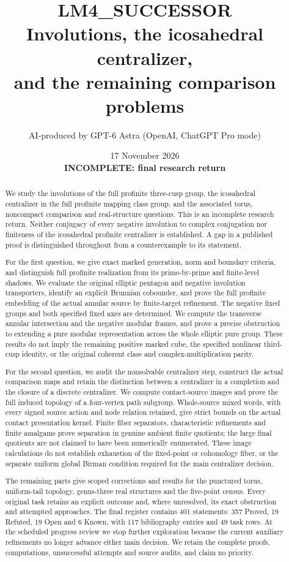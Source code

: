 \documentclass[11pt,a4paper]{article}
\title{LM4\_SUCCESSOR\\Involutions, the icosahedral centralizer,\\and the remaining comparison problems}
\author{AI-produced by GPT-6 Astra (OpenAI, ChatGPT Pro mode)}
\date{17 November 2026\\\textbf{INCOMPLETE: final research return}}
\begin{document}
\maketitle
\begin{abstract}
We study the involutions of the full profinite three-cusp group,
the icosahedral centralizer in the full profinite mapping class group,
and the associated torus, noncompact comparison and real-structure
questions. This is an incomplete research return. Neither conjugacy
of every negative involution to complex conjugation nor finiteness of
the icosahedral profinite centralizer is established. A gap in a
published proof is distinguished throughout from a counterexample to
its statement.

For the first question, we give exact marked generation, norm and
boundary criteria, and distinguish full profinite realization from
its prime-by-prime and finite-level shadows. We evaluate the original
elliptic pentagon and negative involution transporters, identify an
explicit Brunnian cobounder, and prove the full profinite embedding
of the actual annular source by finite-target refinement. The
negative fixed groups and both specified fixed axes are determined.
We compute the transverse annular intersection and the negative
modular frames, and prove a precise obstruction to extending a pure
modular representation across the whole elliptic pure group. These
results do not imply the remaining positive marked cube, the
specified nonlinear third-cusp identity, or the original coherent
class and complex-multiplication parity.

For the second question, we audit the nonsolvable centralizer step,
construct the actual comparison maps and retain the distinction
between a centralizer in a completion and the closure of a discrete
centralizer. We compute contact-source images and prove the full
induced topology of a four-vertex path subgroup. Whole-source mixed
words, with every signed source action and node relation retained,
give strict bounds on the actual contact presentation kernel.
Finite fiber separators, characteristic refinements and finite
amalgams prove separation in genuine ambient finite quotients;
the large final quotients are not claimed to have been numerically
enumerated. These image calculations do not establish exhaustion
of the fixed-point or cohomology fiber, or the separate uniform
global Birman condition required for the main centralizer decision.

The remaining parts give scoped corrections and results for the
punctured torus, uniform-tail topology, genus-three real structures
and the five-point census. Every original task retains an explicit
outcome and, where unresolved, its exact obstruction and attempted
approaches. The final register contains 401 statements: 357 Proved,
19 Refuted, 19 Open and 6 Known, with 117 bibliography entries and
49 task rows. At the scheduled progress review we stop further
exploration because the current auxiliary refinements no longer
advance either main decision. We retain the complete proofs,
computations, unsuccessful attempts and source audits, and claim
no priority.
\end{abstract}
\tableofcontents
\clearpage
\end{document}
